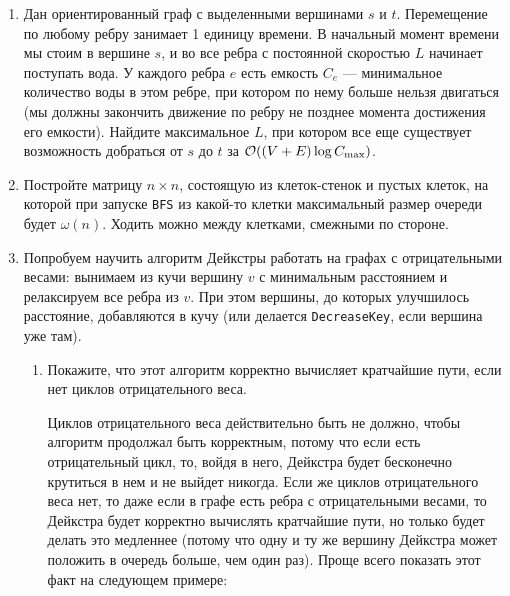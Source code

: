 \begin{enumerate}
  \item
    Дан ориентированный граф с выделенными вершинами $s$ и $t$. Перемещение по любому ребру занимает 1 единицу времени.
    В начальный момент времени мы стоим в вершине $s$, и во все ребра с постоянной скоростью $L$ начинает поступать вода.
    У каждого ребра $e$ есть емкость $C_e$ --- минимальное количество воды в этом ребре, при котором по нему больше
    нельзя двигаться (мы должны закончить движение по ребру не позднее момента достижения его емкости). Найдите
    максимальное $L$, при котором все еще существует возможность добраться от $s$ до $t$ за $\mathcal{O}((V + E)\log{C_{\max}})$.

  \item
    Постройте матрицу $n \times n$, состоящую из клеток-стенок и пустых клеток,
    на которой при запуске \texttt{BFS} из какой-то клетки максимальный
    размер очереди будет $\omega(n)$. Ходить можно между клетками, смежными по стороне.

  \item
    Попробуем научить алгоритм Дейкстры работать на графах с отрицательными весами: вынимаем из кучи вершину $v$
    с минимальным расстоянием и релаксируем все ребра из $v$. При этом вершины, до которых улучшилось расстояние,
    добавляются в кучу (или делается \texttt{DecreaseKey}, если вершина уже там).
    \begin{enumerate}
      \item Покажите, что этот алгоритм корректно вычисляет кратчайшие пути, если нет циклов отрицательного веса.
      \begin{solution}
        Циклов отрицательного веса действительно быть не должно, чтобы алгоритм продолжал быть корректным, потому что если есть отрицательный цикл, то, войдя в него, Дейкстра будет бесконечно крутиться в нем и не выйдет никогда. Если же циклов отрицательного веса нет, то даже если в графе есть ребра с отрицательными весами, то Дейкстра будет корректно вычислять кратчайшие пути, но только будет делать это медленнее (потому что одну и ту же вершину Дейкстра может положить в очередь больше, чем один раз). Проще всего показать этот факт на следующем примере:
        

\end{solution}
\end{enumerate}
\end{enumerate}
